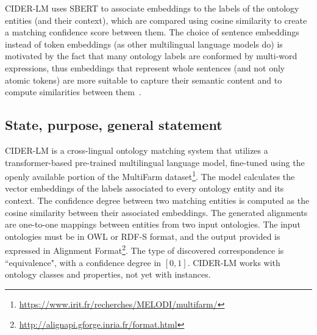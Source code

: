 \documentclass[
]{ceurart}
\begin{document}



CIDER-LM uses SBERT to associate embeddings to the labels of the ontology entities (and their context), which are compared using cosine similarity to create a matching confidence score between them. The choice of sentence embeddings instead of token embeddings (as other multilingual language models do) is motivated by the fact that many ontology labels are conformed by multi-word expressions, thus embeddings that represent whole sentences (and not only atomic tokens) are more suitable to capture their semantic content and to compute similarities between them~\cite{Neutela2021, Reimers2019}.

\subsection{State, purpose, general statement}

CIDER-LM is a cross-lingual ontology matching system that utilizes a transformer-based pre-trained multilingual language model, fine-tuned using the openly available portion of the MultiFarm dataset\footnote{\url{https://www.irit.fr/recherches/MELODI/multifarm/}}. The model calculates the vector embeddings of the labels associated to
every ontology entity and its context. The confidence degree between two matching entities is computed as
the cosine similarity between their associated embeddings.
The generated alignments are one-to-one mappings between entities from two input ontologies. The input ontologies must be in OWL or RDF-S format, and the output provided is expressed in Alignment Format\footnote{\url{http://alignapi.gforge.inria.fr/format.html}}. The type of discovered correspondence is ``equivalence", with a confidence degree in $[0,1]$. CIDER-LM works with ontology classes and properties, not yet with instances.
\end{document}
